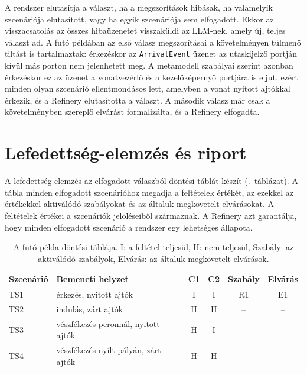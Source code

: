 A rendszer elutasítja a választ, ha a megszorítások hibásak, ha valamelyik szcenáriója elutasított, vagy ha egyik szcenáriója sem elfogadott. Ekkor az  visszacsatolás az összes hibaüzenetet visszaküldi az LLM-nek, amely új, teljes választ ad. A futó példában az első válasz megszorításai a követelményen túlmenő tiltást is tartalmaztak: érkezéskor az \texttt{ArrivalEvent} üzenet az utaskijelző portján kívül más porton nem jelenhetett meg. A metamodell szabályai szerint azonban érkezéskor ez az üzenet a vonatvezérlő és a kezelőképernyő portjára is eljut, ezért minden olyan szcenárió ellentmondásos lett, amelyben a vonat nyitott ajtókkal érkezik, és a Refinery elutasította a választ. A második válasz már csak a követelményben szereplő elvárást formalizálta, és a Refinery elfogadta.


\section{Lefedettség-elemzés és riport}
\label{sec:overview-coverage}

A  lefedettség-elemzés az elfogadott válaszból döntési táblát készít (.~táblázat). A tábla minden elfogadott szcenárióhoz megadja a feltételek értékét, az ezekkel az értékekkel aktiválódó szabályokat és az általuk megkövetelt elvárásokat. A feltételek értékei a szcenáriók jelöléseiből származnak. A Refinery azt garantálja, hogy minden elfogadott szcenárió a rendszer egy lehetséges állapota.

\begin{table}[!ht]
	\footnotesize
	\centering
	\begin{tabular}{l >{\raggedright\arraybackslash}p{} c c c c}
		\toprule
		Szcenárió & Bemeneti helyzet & C1 & C2 & Szabály & Elvárás \\
		\midrule
		TS1 & érkezés, nyitott ajtók & I & I & R1 & E1 \\
		TS2 & indulás, zárt ajtók & H & H & -- & -- \\
		TS3 & vészfékezés peronnál, nyitott ajtók & H & I & -- & -- \\
		TS4 & vészfékezés nyílt pályán, zárt ajtók & H & H & -- & -- \\
		\bottomrule
	\end{tabular}
	\caption{A futó példa döntési táblája. I: a feltétel teljesül, H: nem teljesül, Szabály: az aktiválódó szabályok, Elvárás: az általuk megkövetelt elvárások.}
	\label{tab:overview-decision}
\end{table}

